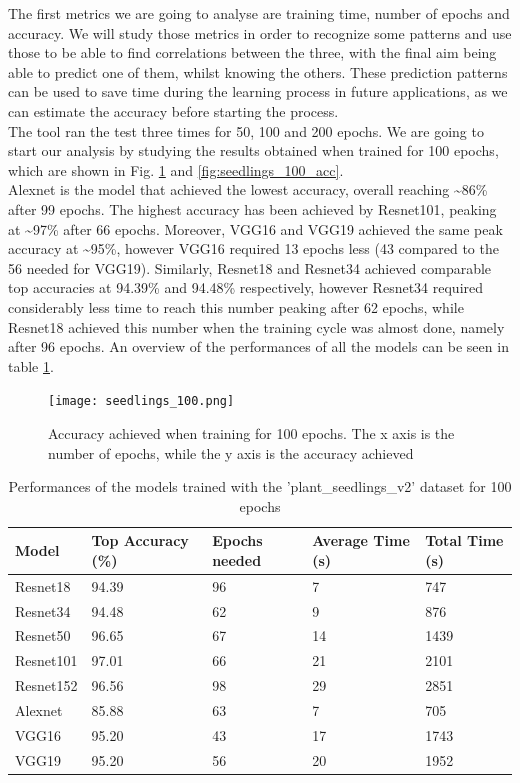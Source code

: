 The first metrics we are going to analyse are training time, number of epochs and accuracy. We will study those metrics in order to recognize some patterns and use those to be able to find correlations between the three, with the final aim being able to predict one of them, whilst knowing the others. These prediction patterns can be used to save time during the learning process in future applications, as we can estimate the accuracy before starting the process.  \\
The tool ran the test three times for 50, 100 and 200 epochs. 
We are going to start our analysis by studying the results obtained when trained for 100 epochs, which are shown in Fig. \ref{fig:seedlings_100_epoch_accuracy} and \ref{fig:seedlings_100_acc}. \\
Alexnet is the model that achieved the lowest accuracy, overall reaching \textasciitilde86\% after 99 epochs. The highest accuracy has been achieved by Resnet101, peaking at \textasciitilde97\% after 66 epochs. Moreover, VGG16 and VGG19 achieved the same peak accuracy at \textasciitilde95\%, however VGG16 required 13 epochs less (43 compared to the 56 needed for VGG19). Similarly, Resnet18 and Resnet34 achieved comparable top accuracies at  94.39\% and 94.48\% respectively, however Resnet34 required considerably less time to reach this number peaking after 62 epochs, while Resnet18 achieved this number when the training cycle was almost done, namely after 96 epochs. An overview of the performances of all the models can be seen in table \ref{tab:performances_seeds}. 

\begin{figure}[h]
       \centering 
	    \texttt{[image: seedlings\_100.png]}
        \caption[Accuracy achieved when training for 100 epochs]{Accuracy achieved when training for 100 epochs. The x axis is the number of epochs, while the y axis is the accuracy achieved}
         \label{fig:seedlings_100_epoch_accuracy}
\end{figure}


\begin{table}[htbp]
\centering
\begin{tabular}{ p{2cm} p{4cm} p{3cm} p{3cm} p{2cm}  }
 Model& Top Accuracy (\%) & Epochs needed &Average Time (s)&Total Time (s)\\
 \hline
Resnet18&94.39&96&7&747\\
Resnet34&94.48&62&9&876\\
Resnet50&96.65&67&14&1439\\
Resnet101&97.01&66&21&2101\\
Resnet152&96.56&98&29&2851\\
Alexnet&85.88&63&7&705\\
VGG16&95.20&43&17&1743\\
VGG19&95.20&56&20&1952\\
 \hline
\end{tabular}
\caption{Performances of the models trained with the 'plant\_seedlings\_v2' dataset for 100 epochs}
\label{tab:performances_seeds}
\end{table}


